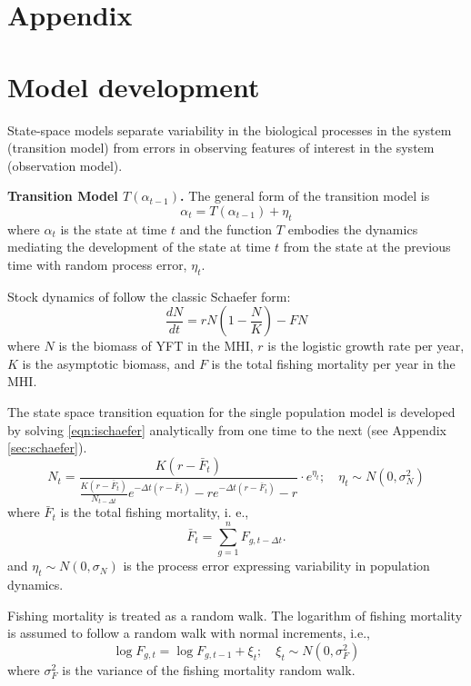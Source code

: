 \documentclass[12pt,letterpaper,twoside]{article}
\begin{document}
\clearpage


\section*{Appendix}
\appendix
\section{Model development}
\label{sec:models}
State-space models separate variability in the biological
processes in the system (transition model)
from errors in observing features of interest
in the system (observation model). 

{\bf Transition Model $T(\alpha_{t-1})$.}
The general form of the transition model is
\begin{equation}
\alpha_t=T(\alpha_{t-1}) + \eta_t
\end{equation}
where $\alpha_t$ is the state at time $t$ and 
the function $T$ embodies the dynamics mediating the
development of the state at time $t$ from the state at the previous
time with random process error, $\eta_t$.

Stock dynamics of follow the classic Schaefer form:
\begin{equation}
\label{eqn:ischaefer}
\frac{dN}{dt} = rN(1-\frac{N}{K}) - FN
\end{equation}
where $N$ is the biomass of YFT in the MHI, 
$r$ is the logistic growth rate per year,
$K$ is the asymptotic biomass, and
$F$ is the total fishing mortality per year in the MHI.

The state space transition equation for the single population model is
developed by solving \ref{eqn:ischaefer} analytically from one time to
the next (see Appendix \ref{sec:schaefer}).
\begin{equation}
\label{eqn:intschaeferA}
N_t = \frac{K(r-\bar{F}_t)}{\frac{K(r-\bar{F}_t)}{N_{t-\Delta t}}e^{-\Delta
t(r-\bar{F}_t)}-re^{-\Delta t(r-\bar{F}_t)} -r} \cdot e^{\eta_t};
\quad \eta_t\sim N(0,\sigma^2_N)
\end{equation}
where 
$\bar{F}_t$ is the total fishing mortality, i. e.,
$$
\bar{F}_t =\sum_{g=1}^n F_{g,t-\Delta t}.
$$
and $\eta_t \sim N(0,\sigma_N)$ is the process error expressing
variability in population dynamics.

Fishing mortality is treated as a random walk.
The logarithm of fishing mortality is assumed to
follow a random walk with normal increments, i.e.,
\begin{equation}
\label{eqn:Fwalk}
\log F_{g,t} = \log F_{g,t-1} + \xi_t;\quad \xi_t\sim
N(0,\sigma^2_F)
\end{equation}
where  $\sigma^2_F$ is the variance of the fishing
mortality random walk.
\end{document}
